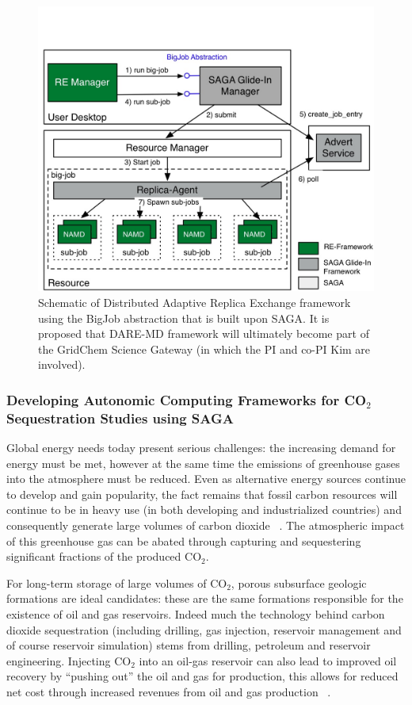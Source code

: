 \documentclass[a4paper,10pt]{article}
\begin{document}
\begin{figure} \begin{center} \includegraphics[scale=0.65]{DARE-MD} \end{center} \caption{Schematic of Distributed Adaptive Replica Exchange framework using the BigJob abstraction that is built upon SAGA. It is proposed that DARE-MD framework will ultimately become part of the GridChem Science Gateway (in which the PI and co-PI Kim are involved).} \label{fig:results} \end{figure}

\subsubsection*{Developing Autonomic Computing Frameworks for CO$_2$ Sequestration Studies using SAGA}

Global energy needs today present serious challenges: the increasing demand for energy must be met, however at the same time the emissions of greenhouse gases into the atmosphere must be reduced. Even as alternative energy sources continue to develop and gain popularity, the fact remains that fossil carbon resources will continue to be in heavy use (in both developing and industrialized countries) and consequently generate large volumes of carbon dioxide ~\cite{GeoRPT}. The atmospheric impact of this greenhouse gas can be abated through capturing and sequestering significant fractions of the produced CO$_2$.

For long-term storage of large volumes of CO$_2$, porous subsurface geologic formations are ideal candidates: these are the same formations responsible for the existence of oil and gas reservoirs. Indeed much the technology behind carbon dioxide sequestration (including drilling, gas injection, reservoir management and of course reservoir simulation) stems from drilling, petroleum and reservoir engineering. Injecting CO$_2$ into an oil-gas reservoir can also lead to improved oil recovery by ``pushing out'' the oil and gas for production, this allows for reduced net cost through increased revenues from oil and gas production ~\cite{EORBook}.
\end{document}
